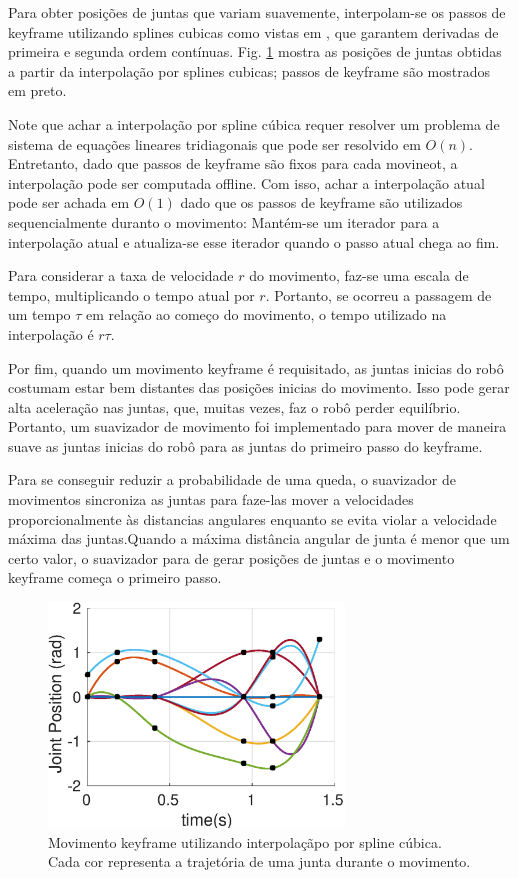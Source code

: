 \documentclass[
10pt, %
a4paper, %
oneside, %
headinclude,footinclude, %
BCOR5mm, %
]{scrartcl}
\begin{document}
Para obter posições de juntas que variam suavemente, interpolam-se os passos de keyframe utilizando splines cubicas como vistas em \cite{Bartels:1987:ISU:35072}, que garantem derivadas de primeira e segunda ordem contínuas. Fig.  \ref{fig:keyframeData} mostra as posições de juntas obtidas a partir da interpolação por splines cubicas; passos de keyframe são mostrados em preto.

Note que achar a interpolação por spline cúbica requer resolver um problema de sistema de equações lineares tridiagonais que pode ser resolvido em \( O(n) \). Entretanto, dado que passos de keyframe são fixos para cada movineot, a interpolação pode ser computada offline. Com isso, achar a interpolação atual pode ser achada em \( O(1) \) dado que os passos de keyframe são utilizados sequencialmente duranto o movimento: Mantém-se um iterador para a interpolação atual e atualiza-se esse iterador quando o passo atual chega ao fim.

Para considerar a taxa de velocidade \( r \) do movimento, faz-se uma escala de tempo, multiplicando o tempo atual por \( r \). Portanto, se ocorreu a passagem de um tempo \( \tau \) em relação ao começo do movimento, o tempo utilizado na interpolação é \( r \tau \).

Por fim, quando um movimento keyframe é requisitado, as juntas inicias do robô costumam estar bem distantes das posições inicias do movimento. Isso pode gerar alta aceleração nas juntas, que, muitas vezes, faz o robô perder equilíbrio. Portanto, um suavizador de movimento foi implementado para mover de maneira suave as juntas inicias do robô para as juntas do primeiro passo do keyframe. 

Para se conseguir reduzir a probabilidade de uma queda, o suavizador de movimentos sincroniza as juntas para faze-las mover a velocidades proporcionalmente às distancias angulares enquanto se evita violar a velocidade máxima das juntas.Quando a máxima distância angular de junta é menor que um certo valor, o suavizador para de gerar posições de juntas e o movimento keyframe começa o primeiro passo.


\begin{figure}[htb]
\begin{center}
\includegraphics[width=0.7\textwidth]{keyframe}
\end{center}
\caption{Movimento keyframe utilizando interpolaçãpo por spline cúbica. Cada cor representa a trajetória de uma junta durante o movimento.}
\label{fig:keyframeData}
\end{figure}
\end{document}
